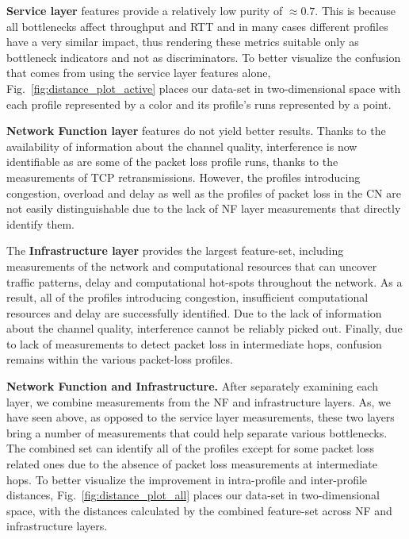 \documentclass[journal,comsoc]{IEEEtran}
\begin{document}
% 
\textbf{Service layer} features provide a relatively low purity of $\approx 0.7$. 
This is because all bottlenecks affect throughput and RTT and in many cases different profiles have a very similar impact, thus rendering these metrics suitable only as bottleneck indicators and not as discriminators.
To better visualize the confusion that comes from using the service layer features alone, Fig.~\ref{fig:distance_plot_active} places our data-set in two-dimensional space with each profile represented by a color and its profile's runs represented by a point.

% 
\textbf{Network Function layer} features do not yield better results.
Thanks to the availability of information about the channel quality, interference is now identifiable as are some of the packet loss profile runs, thanks to the measurements of TCP retransmissions.
However, the profiles introducing congestion, overload and delay as well as the profiles of packet loss in the CN are not easily distinguishable due to the lack of NF layer measurements that directly identify them.

% 

The \textbf{Infrastructure layer} provides the largest feature-set, including measurements of the network and computational resources that can uncover traffic patterns, delay and computational hot-spots throughout the network.
As a result, all of the profiles introducing congestion, insufficient computational resources and delay are successfully identified.
Due to the lack of information about the channel quality, interference cannot be reliably picked out.
Finally, due to lack of measurements to detect packet loss in intermediate hops, confusion remains within the various packet-loss profiles.

% 
\textbf{Network Function and Infrastructure.}
After separately examining each layer, we combine measurements from the NF and infrastructure layers.
As, we have seen above, as opposed to the service layer measurements, these two layers bring a number of measurements that could help separate various bottlenecks.   
The combined set can identify all of the profiles except for some packet loss related ones due to the absence of packet loss measurements at intermediate hops.  
To better visualize the improvement in intra-profile and inter-profile distances, Fig.~\ref{fig:distance_plot_all} places our data-set in two-dimensional space, with the distances calculated by the combined feature-set across NF and infrastructure layers.
\end{document}
